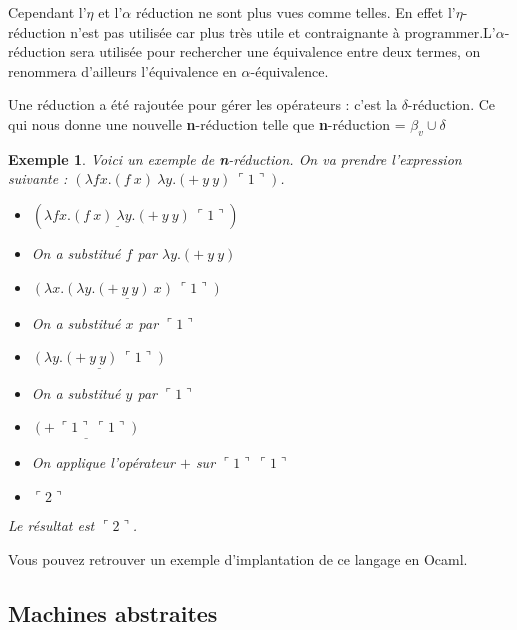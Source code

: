 \documentclass[10pt,a4paper]{report}
\newtheorem{ex}{Exemple}
\begin{document}
	Cependant l'$\eta$ et l'$\alpha$ réduction ne sont plus vues comme telles. En effet l'$\eta$-réduction n'est pas utilisée car plus très utile et contraignante à programmer.L'$\alpha$-réduction sera utilisée pour rechercher une équivalence entre deux termes, on renommera d'ailleurs l'équivalence en $\alpha$-équivalence.
	\medbreak
	
	Une réduction a été rajoutée pour gérer les opérateurs : c'est la $\delta$-réduction. Ce qui nous donne une nouvelle \textbf{n}-réduction telle que \textbf{n}-réduction = $\beta_{v} \cup \delta$
	\bigbreak
	
	\begin{ex}
		Voici un exemple de \textbf{n}-réduction. On va prendre l'expression suivante : $(\lambda f x.(f~x)~\lambda y.(+~y~y)~\ulcorner 1\urcorner)$. 
		\smallbreak
		\begin{itemize}
			\item[] $(\underline{\lambda f x.(f~x)~\lambda y.(+~y~y)}~\ulcorner 1\urcorner)$
			\item[] On a substitué $f$ par $\lambda y.(+~y~y)$
			\item[$\rightarrow^{\beta}_{n}$] $\underline{(\lambda x.(\lambda y.(+~y~y)~x)~\ulcorner 1\urcorner)}$
			
			\item[] On a substitué $x$ par $\ulcorner 1\urcorner$
			\item[$\rightarrow^{\beta}_{n}$] $\underline{(\lambda y.(+~y~y)~\ulcorner 1\urcorner)}$
			
			\item[] On a substitué $y$ par $\ulcorner 1\urcorner$
			\item[$\rightarrow^{\beta}_{n}$] $\underline{(+~\ulcorner 1\urcorner~\ulcorner 1\urcorner)}$
			
			\item[] On applique l'opérateur $+$ sur $\ulcorner 1\urcorner~\ulcorner 1\urcorner$
			\item[$\rightarrow^{\delta}_{n}$] $\ulcorner 2\urcorner$
		\end{itemize}
		\smallbreak
		Le résultat est $\ulcorner 2\urcorner$.
	\end{ex}
	\medbreak
	
	Vous pouvez retrouver un exemple d'implantation de ce langage en Ocaml.
	
	\subsection{Machines abstraites}
	
\end{document}

